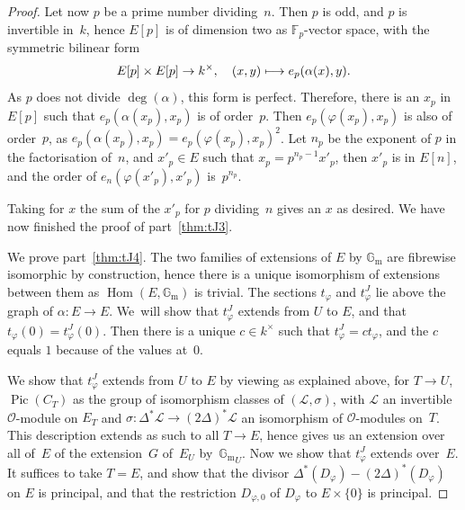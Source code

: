 \documentclass[JEP,XML,SOM,Unicode,NoFloatCountersInSection]{cedram}
\let\mathcal\mathscr
\def\mto{\mathchoice{\longmapsto}{\mapsto}{\mapsto}{\mapsto}}
\theoremstyle{plain}
\theoremstyle{definition}
\numberwithin{equation}{subsection}
\let\phi\varphi
\newcommand{\F}{\mathbb F}
\renewcommand{\G}{\mathbb G}
\newcommand{\calL}{\mathcal{L}}
\newcommand{\calO}{\mathcal{O}}
\newcommand{\Gm}{\G_{\mathrm{m}}}
\DeclareMathOperator{\Hom}{Hom}
\DeclareMathOperator{\Pic}{Pic}
\begin{document}
\begin{proof}
Let now $p$ be a prime number dividing~$n$. Then $p$ is odd, and $p$
is invertible in~$k$, hence $E[p]$ is of dimension two as
$\F_p$-vector space, with the symmetric bilinear form\enlargethispage{-\baselineskip}
\[
E[p]\times E[p] \to k^\times,\quad (x,y)\mto e_p(\alpha(x),y).
\]
As $p$ does not divide $\deg(\alpha)$, this form is
perfect. Therefore, there is an $x_p$ in $E[p]$ such that
$e_p(\alpha(x_p),x_p)$ is of order~$p$. Then $e_p(\phi(x_p),x_p)$ is
also of order~$p$, as $e_p(\alpha(x_p),x_p)=e_p(\phi(x_p),x_p)^2$. Let
$n_p$ be the exponent of $p$ in the factorisation of~$n$, and
$x'_p\in E$ such that $x_p=p^{n_p-1}x'_p$, then $x'_p$ is in $E[n]$,
and the order of $e_n(\phi(x'_p),x'_p)$ is~$p^{n_p}$.

Taking for $x$ the sum of the $x'_p$ for $p$ dividing~$n$ gives an $x$
as desired. We have now finished the proof of part~\eqref{thm:tJ3}.

We prove part~\eqref{thm:tJ4}. The two families of extensions of $E$ by $\Gm$ are
fibrewise isomorphic by construction, hence there is a unique
isomorphism of extensions between them as $\Hom(E,\Gm)$ is
trivial. The sections $t_\phi$ and $t^J_\phi$ lie above the graph of
$\alpha\colon E\to E$. We~will show that $t^J_\phi$ extends from $U$
to $E$, and that $t_\phi(0)=t^J_\phi(0)$. Then there is a unique $c\in
k^\times$ such that $t^J_\phi=ct_\phi$, and the $c$ equals $1$ because
of the values at~$0$.

We show that $t^J_\phi$ extends from $U$ to $E$ by viewing as
explained above, for $T\to U$, $\Pic(C_T)$ as the group of isomorphism
classes of $(\calL,\sigma)$, with $\calL$ an invertible $\calO$\nobreakdash-module
on $E_T$ and $\sigma\colon \Delta^*\calL\to (2\Delta)^*\calL$ an
isomorphism of $\calO$-modules on~$T$. This description extends as
such to all $T\to E$, hence gives us an extension over all of~$E$ of
the extension~$G$ of~$E_U$ by~${\Gm}_U$. Now we show that
$t^J_\phi$ extends over~$E$. It suffices to take $T=E$, and show that
the divisor $\Delta^*(D_\phi)-(2\Delta)^*(D_\phi)$ on $E$ is principal,
and that the restriction $D_{\phi,0}$ of $D_\phi$ to $E\times\{0\}$ is
principal.


\end{proof}
\end{document}
